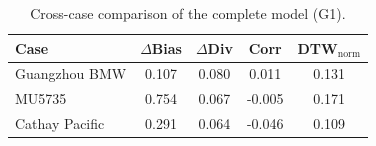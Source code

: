 \begin{table}[t]
\centering
\caption{Cross-case comparison of the complete model (G1).}
\label{tab:cross_case_g1}
\begin{tabular}{lcccc}
\toprule
Case & $\Delta$Bias & $\Delta$Div & Corr & DTW$_{\mathrm{norm}}$ \\
\midrule
Guangzhou BMW & 0.107 & 0.080 & 0.011 & 0.131 \\
MU5735 & 0.754 & 0.067 & -0.005 & 0.171 \\
Cathay Pacific & 0.291 & 0.064 & -0.046 & 0.109 \\
\bottomrule
\end{tabular}
\end{table}

